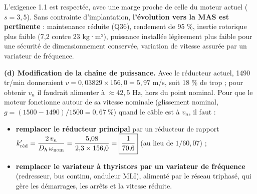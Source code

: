 \documentclass[11pt,a4paper]{article}
\providecommand{\tightlist}{\setlength{\itemsep}{0pt}\setlength{\parskip}{0pt}}
\newcommand{\equationajustee}[1]{%
  \sbox{\boiteequation}{$\displaystyle #1$}%
  \ifdim\wd\boiteequation>\linewidth
    \[\resizebox{\linewidth}{!}{\usebox{\boiteequation}}\]%
  \else
    \[#1\]%
  \fi}
\begin{document}
\equationajustee{s=\frac{400}{119{,}4}=\boxed{3{,}35>3}.}

L'exigence 1.1 est respectée, avec une marge proche de celle du moteur actuel (\(s=3{,}5\)). Sans contrainte d'implantation, \textbf{l'évolution vers la MAS est pertinente} : maintenance réduite (Q36), rendement de 95 \%, inertie rotorique plus faible (7,2 contre 23 kg·m²), puissance installée légèrement plus faible pour une sécurité de dimensionnement conservée, variation de vitesse assurée par un variateur de fréquence.

\textbf{(d) Modification de la chaîne de puissance.} Avec le réducteur actuel, 1490 tr/min donneraient \(v=0{,}03829\times156{,}0=5{,}97\) m/s, soit 18 \% de trop ; pour obtenir \(v_n\) il faudrait alimenter à \(\approx42{,}5\) Hz, hors du point nominal. Pour que le moteur fonctionne autour de sa vitesse nominale (glissement nominal, \(g=(1500-1490)/1500=0{,}67\ \%\)) quand le câble est à \(v_n\), il faut :

\begin{itemize}
\tightlist
\item
  \textbf{remplacer le réducteur principal} par un réducteur de rapport \(k'_{\text{\text{réd}}}=\dfrac{2\,v_n}{D_h\,\omega_{\text{nom}}}=\dfrac{5{,}08}{2{,}3\times156{,}0}=\boxed{\dfrac1{70{,}6}}\) (au lieu de \(1/60{,}07\)) ;
\item
  \textbf{remplacer le variateur à thyristors par un variateur de fréquence} (redresseur, bus continu, onduleur MLI), alimenté par le réseau triphasé, qui gère les démarrages, les arrêts et la vitesse réduite.
\end{itemize}
\end{document}
